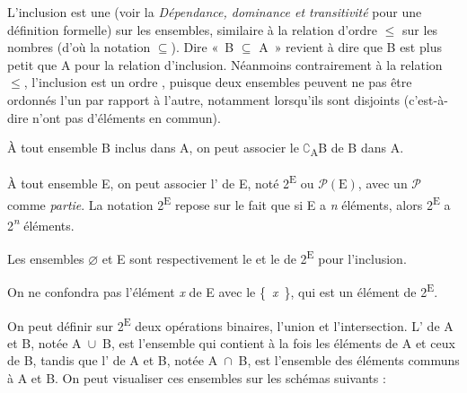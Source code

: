 {    L’inclusion est une  (voir la  \textit{Dépendance, dominance et transitivité} pour une définition formelle) sur les ensembles, similaire à la relation d’ordre ${\leq}$ sur les nombres (d’où la notation \textrm{${\subseteq}$}). Dire «~B \textrm{${\subseteq}$} A~» revient à dire que B est plus petit que A pour la relation d’inclusion. Néanmoins contrairement à la relation ${\leq}$, l’inclusion est un ordre , puisque deux ensembles peuvent ne pas être ordonnés l’un par rapport à l’autre, notamment lorsqu’ils sont disjoints (c’est-à-dire n’ont pas d’éléments en commun).
                      
    À tout ensemble B inclus dans A, on peut associer le  \textrm{${\complement}$}\textsubscript{A}B de B dans A.

    À tout ensemble E, on peut associer l’ de E, noté 2\textsuperscript{E} ou $\mathcal{P}(\text{E})$, avec un $\mathcal{P}$ comme \textit{partie}. La notation 2\textsuperscript{E} repose sur le fait que si E a \textit{n} éléments, alors 2\textsuperscript{E} a 2\textit{\textsuperscript{n}} éléments.

    Les ensembles \textrm{${\varnothing}$} et E sont respectivement le  et le  de 2\textsuperscript{E} pour l’inclusion.

    On ne confondra pas l’élément \textit{x} de E avec le  \{~\textit{x}~\}, qui est un élément de 2\textsuperscript{E}.

    On peut définir sur 2\textsuperscript{E} deux opérations binaires, l’union et l’intersection. L’ de A et B, notée A~\textrm{${\cup}$}~B, est l’ensemble qui contient à la fois les éléments de A et ceux de B, tandis que l’ de A et B, notée A~\textrm{${\cap}$}~B, est l’ensemble des éléments communs à A et B. On peut visualiser ces ensembles sur les schémas suivants :

}
